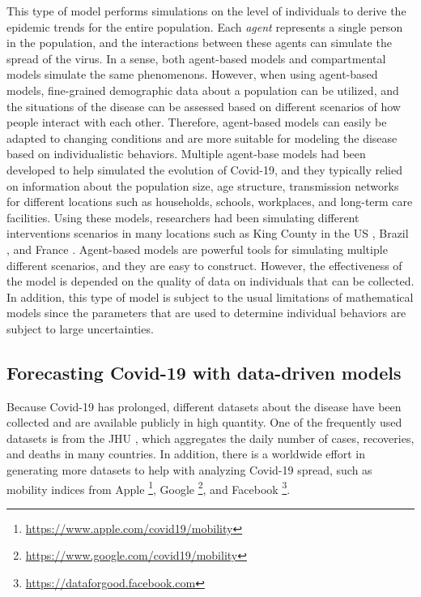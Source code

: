 This type of model performs simulations on the level of individuals to derive the epidemic trends for the entire population.
Each \textit{agent} represents a single person in the population, and the interactions between these agents can simulate the spread of the virus.
In a sense, both agent-based models and compartmental models simulate the same phenomenons.
However, when using agent-based models, fine-grained demographic data about a population can be utilized, and the situations of the disease can be assessed based on different scenarios of how people interact with each other.
Therefore, agent-based models can easily be adapted to changing conditions and are more suitable for modeling the disease based on individualistic behaviors.
Multiple agent-base models had been developed to help simulated the evolution of Covid-19, and they typically relied on information about the population size, age structure, transmission networks for different locations such as households, schools, workplaces, and long-term care facilities.
Using these models, researchers had been simulating different interventions scenarios in many locations such as King County in the \gls{US} \cite{kerrCovasimAgentbasedModel2021}, Brazil \cite{silvaCOVIDABSAgentbasedModel2020}, and France \cite{hoertelStochasticAgentbasedModel2020}.
Agent-based models are powerful tools for simulating multiple different scenarios, and they are easy to construct.
However, the effectiveness of the model is depended on the quality of data on individuals that can be collected.
In addition, this type of model is subject to the usual limitations of mathematical models since the parameters that are used to determine individual behaviors are subject to large uncertainties.

\subsection{Forecasting Covid-19 with data-driven models}

Because Covid-19 has prolonged, different datasets about the disease have been collected and are available publicly in high quantity.
One of the frequently used datasets is from the \gls{JHU} \cite{dongInteractiveWebbasedDashboard2020}, which aggregates the daily number of cases, recoveries, and deaths in many countries.
In addition, there is a worldwide effort in generating more datasets to help with analyzing Covid-19 spread, such as mobility indices from Apple \footnote{\url{https://www.apple.com/covid19/mobility}}, Google \footnote{\url{https://www.google.com/covid19/mobility}}, and Facebook \footnote{\url{https://dataforgood.facebook.com}}.

